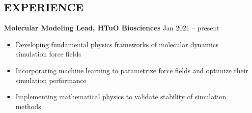 \documentclass[11pt,letterpaper, sans]{article}
\newcommand{\newsec}[1]{\subsection*{\hspace{-1.5pt}\uppercase{#1}}}
\begin{document}
\begin{flushleft}
\newsec{Experience}

{\bf Molecular Modeling Lead,
HTuO Biosciences} 
\hfill Jan 2021 -- present
\vspace{-0.5em} \\
\begin{itemize}[leftmargin=*]\itemsep-0.2em
\item Developing fundamental physics frameworks of molecular dynamics simulation force fields
\item Incorporating machine learning to parametrize force fields and optimize their simulation performance
\item Implementing mathematical physics to validate stability of simulation methods
\end{itemize}



\vspace{-1.5em}\ \


\end{flushleft}
\end{document}
